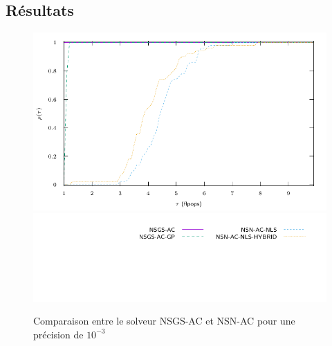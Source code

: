 \documentclass{CSMA2017}
\begin{document}
\subsection{Résultats}
\begin{figure}
  \centering
  \includegraphics{figure/LowWall_FEM.1e-3.with_guess/simple/profile-LMGC_LowWall_FEM.pdf}
  \includegraphics{figure/LowWall_FEM.1e-3.with_guess/simple/profile-LMGC_LowWall_FEM_legend.pdf}
  \caption{Comparaison entre le solveur NSGS-AC et NSN-AC pour une précision de $10^{-3}$}
  \label{fig:LowWall_FEM.1e-3.simple}
\end{figure}
\end{document}

